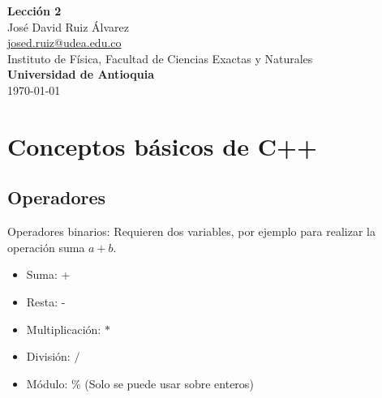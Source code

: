 \documentclass[10.5pt]{article}
\begin{document}
\noindent
\begin{minipage}[b]{0.75\linewidth}
{\LARGE\bf Lecci\'{o}n 2}\\ %
\large{Jos\'{e} David Ruiz \'{A}lvarez} \\
\small{\href{mailto:josed.ruiz@udea.edu.co}{josed.ruiz@udea.edu.co}} \\ %
\normalsize{Instituto de Física, Facultad de Ciencias Exactas y Naturales} \\%
\normalsize{\bf Universidad de Antioquia} \\[8mm]
\today %
\end{minipage}%




\section{Conceptos básicos de C++}

\subsection{Operadores}
Operadores binarios: Requieren dos variables, por ejemplo para realizar la operación suma $a+b$.

\begin{itemize}
\item Suma: +
\item Resta: -
\item Multiplicación: $*$
\item División: $/$
\item Módulo: \% (Solo se puede usar sobre enteros)
\end{itemize}
\end{document}
